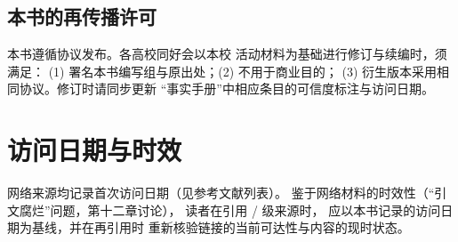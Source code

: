 \subsection{本书的再传播许可}

本书遵循协议发布。各高校同好会以本校
活动材料为基础进行修订与续编时，须满足：
(1) 署名本书编写组与原出处；(2) 不用于商业目的；
(3) 衍生版本采用相同协议。修订时请同步更新
“事实手册”中相应条目的可信度标注与访问日期。

\section{访问日期与时效}

网络来源均记录首次访问日期（见参考文献列表）。
鉴于网络材料的时效性（“引文腐烂”问题，第十二章讨论），
读者在引用  /  级来源时，
应以本书记录的访问日期为基线，并在再引用时
重新核验链接的当前可达性与内容的现时状态。

\noindent{}
